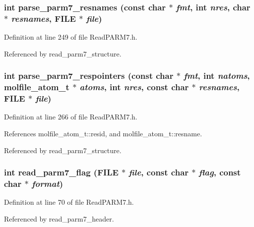 \subsubsection{\setlength{\rightskip}{0pt plus 5cm}int parse\_\-parm7\_\-resnames (const char $\ast$ {\em fmt}, int {\em nres}, char $\ast$ {\em resnames}, FILE $\ast$ {\em file})\hspace{0.3cm}{\tt  [static]}}\label{ReadPARM7_8h_a10}




Definition at line 249 of file Read\-PARM7.h.

Referenced by read\_\-parm7\_\-structure.
\subsubsection{\setlength{\rightskip}{0pt plus 5cm}int parse\_\-parm7\_\-respointers (const char $\ast$ {\em fmt}, int {\em natoms}, {\bf molfile\_\-atom\_\-t} $\ast$ {\em atoms}, int {\em nres}, const char $\ast$ {\em resnames}, FILE $\ast$ {\em file})\hspace{0.3cm}{\tt  [static]}}\label{ReadPARM7_8h_a11}




Definition at line 266 of file Read\-PARM7.h.

References molfile\_\-atom\_\-t::resid, and molfile\_\-atom\_\-t::resname.

Referenced by read\_\-parm7\_\-structure.
\subsubsection{\setlength{\rightskip}{0pt plus 5cm}int read\_\-parm7\_\-flag (FILE $\ast$ {\em file}, const char $\ast$ {\em flag}, const char $\ast$ {\em format})\hspace{0.3cm}{\tt  [static]}}\label{ReadPARM7_8h_a4}




Definition at line 70 of file Read\-PARM7.h.

Referenced by read\_\-parm7\_\-header.
